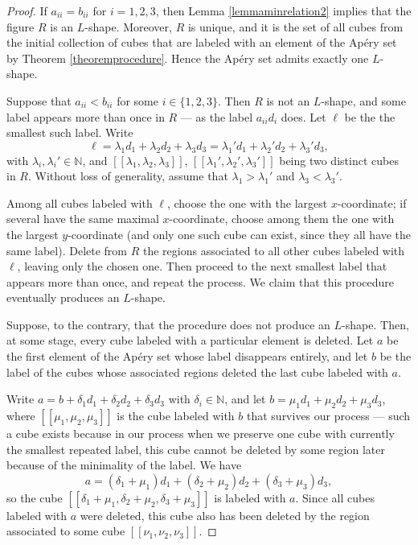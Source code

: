 \documentclass[12pt]{article}
\theoremstyle{remark}
\begin{document}
\begin{proof}
    If $a_{ii}=b_{ii}$ for $i=1,2,3$, then Lemma \ref{lemmaminrelation2} implies that the figure $R$ is an $L$-shape. Moreover, $R$ is unique, and it is the set of all cubes from the initial collection of cubes that are labeled with an element of the Ap{\'e}ry set by Theorem \ref{theoremprocedure}. Hence the Ap{\'e}ry set admits exactly one $L$-shape.

    
    Suppose that $a_{ii}<b_{ii}$ for some $i \in \{1,2,3\}$. Then $R$ is not an $L$-shape, and some label appears more than once in $R$ --- as the label $a_{ii}d_i$ does. Let $\ell$ be the the smallest such label. Write 
    $$\ell =\lambda_1d_1 + \lambda_2d_2 + \lambda_3d_3 = \lambda_1'd_1 + \lambda_2'd_2 + \lambda_3'd_3,$$
    with $\lambda_i,\lambda_i' \in \mathbb{N}$, and $[[\lambda_1,\lambda_2,\lambda_3]]$, $[[\lambda_1',\lambda_2',\lambda_3']]$ being two distinct cubes in $R$. Without loss of generality, assume that $\lambda_1 > \lambda_1'$ and $\lambda_3 < \lambda_3'$. 

    Among all cubes labeled with $\ell$, choose the one with the largest $x$-coordinate; if several have the same maximal $x$-coordinate, choose among them the one with the largest $y$-coordinate (and only one such cube can exist, since they all have the same label). Delete from $R$ the regions associated to all other cubes labeled with $\ell$, leaving only the chosen one. Then proceed to the next smallest label that appears more than once, and repeat the process. We claim that this procedure eventually produces an $L$-shape.

    Suppose, to the contrary, that the procedure does not produce an $L$-shape. Then, at some stage, every cube labeled with a particular element is deleted. Let $a$ be the first element of the Ap{\'e}ry set whose label disappears entirely, and let $b$ be the label of the cubes whose associated regions deleted the last cube labeled with $a$. 
    
    Write $a =b+ \delta_1d_1 +\delta_2d_2+\delta_3d_3  $ with $\delta_i \in \mathbb{N}$, and let $b = \mu_1d_1 + \mu_2d_2 + \mu_3d_3$, where $[[\mu_1,\mu_2,\mu_3]]$ is the cube labeled with $b$ that survives our process --- such a cube exists because in our process when we preserve one cube with currently the smallest repeated label, this cube cannot be deleted by some region later because of the minimality of the label. We have 
    $$a = ( \delta_1+\mu_1)d_1 + ( \delta_2+\mu_2)d_2 + ( \delta_3+\mu_3)d_3,$$
    so the cube $[[\delta_1+\mu_1,\delta_2+\mu_2,\delta_3+\mu_3]]$ is labeled with $a$. Since all cubes labeled with $a$ were deleted, this cube also has been deleted by the region associated to some cube $[[\nu_1,\nu_2,\nu_3]]$. 
    

\end{proof}
\end{document}
